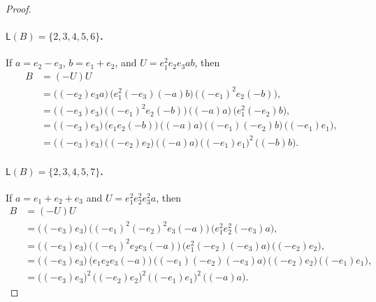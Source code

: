 \documentclass[a4paper, 10pt]{amsart}
\theoremstyle{plain}
\theoremstyle{definition}
\theoremstyle{definition}
\numberwithin{equation}{section}
\begin{document}
\begin{proof}
	\paragraph*{$\mathsf L(B)=\{2,3,4,5,6\}$.}
	If $a=e_2-e_3$,  $b=e_1+e_2$, and 
	$U=e_1^2e_2e_3ab$, then
	\begin{align*}
	B & = (-U)U \\
	&=\bigl((-e_2)e_3a\bigr)
	\,\bigl(e_1^2(-e_3)(-a)b\bigr)
	\,\bigl((-e_1)^2e_2(-b)\bigr),\\
	&= \big( (-e_3){e_3}\big)\,\bigl((-e_1)^2e_2(-b)\bigr)
	\, \big( (-a) {a}\big) \,\bigl(e_1^2(-e_2)b\bigr),\\
	&= \big( (-e_3){e_3}\big) \,\bigl(e_1e_2(-b)\bigr)
	\, \big( (-a){a}\big) \,\bigl((-e_1)(-e_2)b\bigr)\, \big( (-e_1){e_1}\big) ,\\
	&= \big( (-e_3){e_3}\big) \, \big( (-e_2){e_2}\big) \, \big( (-a){a}\big) \, \big( (-e_1){e_1}\big)^2\, \big( (-b){b}\big).
	\end{align*}

	\paragraph*{$\mathsf L(B)=\{2,3,4,5,7\}$.}
	If $a=e_1+e_2+e_3$ and   $U=e_1^2e_2^2e_3^2a$, then
	\begin{align*}
	B & = (-U)U \\
	&= \big( (-e_3){e_3}\big) \,\bigl((-e_1)^2(-e_2)^2e_3(-a)\bigr)
	\,\bigl(e_1^2e_2^2(-e_3)a\bigr),\\
	&= \big( (-e_3){e_3}\big) \,\bigl((-e_1)^2e_2e_3(-a)\bigr)
	\,\bigl(e_1^2(-e_2)(-e_3)a\bigr)\, \big( (-e_2){e_2}\big),\\
	&= \big( (-e_3){e_3}\big) \,\bigl(e_1e_2e_3(-a)\bigr)
	\,\bigl((-e_1)(-e_2)(-e_3)a\bigr)\, \big( (-e_2){e_2}\big) \, \big( (-e_1){e_1} \big),\\
	&= \big( (-e_3){e_3}\big)^2\, \big( (-e_2){e_2}\big)^2\, \big( (-e_1){e_1}\big)^2\, \big( (-a){a}\big).
	\end{align*}


\end{proof}
\end{document}
